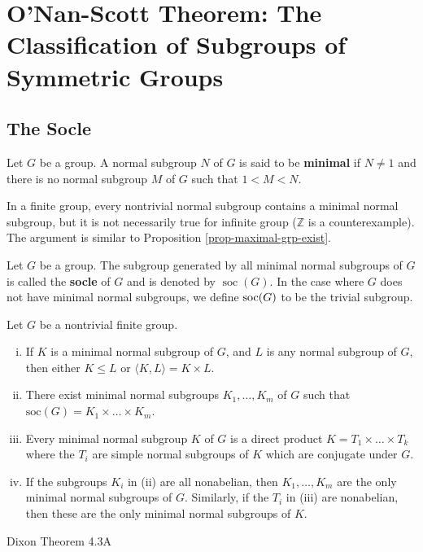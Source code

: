\section{O'Nan-Scott Theorem: The Classification of Subgroups of Symmetric Groups}
\subsection{The Socle}
\begin{definition}
	Let $G$ be a group. A normal subgroup $N$ of $G$ is said to be \textbf{minimal} if $N\neq 1$ and there is no normal subgroup $M$ of $G$ such that $1<M< N$.
\end{definition}
\begin{remark}
	In a  finite group, every nontrivial normal subgroup contains a minimal normal subgroup, but it is not necessarily true for infinite group ($\mathbb{Z}$ is a counterexample). The argument is similar to Proposition \ref{prop-maximal-grp-exist}.
\end{remark}

\begin{definition}
	Let $G$ be a group. The subgroup generated by  all minimal normal subgroups of $G$ is called the \textbf{socle} of $G$ and is denoted by $\operatorname{soc}(G)$. In the case where $G$ does not have minimal normal subgroups, we define $\operatorname{soc}(G)$ to be the trivial subgroup.
\end{definition}

\begin{theorem} \label{thm-minimal-normal-properties}
	Let $G$ be a nontrivial finite group.
	\begin{enumerate}[(i)]
		\item If $K$ is a minimal normal subgroup of $G$, and $L$ is any normal subgroup of $G$, then either $K \leq L$ or $\langle K, L \rangle = K \times L$.
		\item There exist minimal normal subgroups $K_1, \dots, K_m$ of $G$ such that $\text{soc}(G) = K_1 \times \dots \times K_m$.
		\item Every minimal normal subgroup $K$ of $G$ is a direct product $K = T_1 \times \dots \times T_k$ where the $T_i$ are simple normal subgroups of $K$ which are conjugate under $G$.
		\item If the subgroups $K_i$ in (ii) are all nonabelian, then $K_1, \dots, K_m$ are the only minimal normal subgroups of $G$. Similarly, if the $T_i$ in (iii) are nonabelian, then these are the only minimal normal subgroups of $K$.
	\end{enumerate}
\end{theorem}
\begin{sketch}
	Dixon Theorem 4.3A
\end{sketch}

